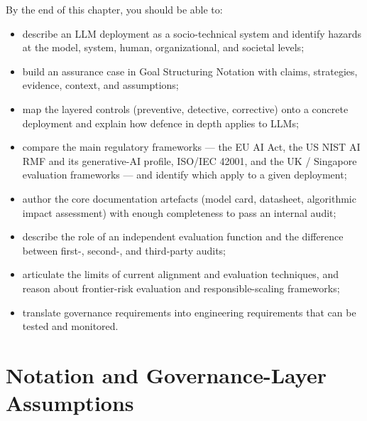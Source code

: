 By the end of this chapter, you should be able to:
\begin{itemize}
  \item describe an LLM deployment as a socio-technical system
        and identify hazards at the model, system, human,
        organizational, and societal levels;
  \item build an assurance case in Goal Structuring Notation
        with claims, strategies, evidence, context, and
        assumptions;
  \item map the layered controls (preventive, detective,
        corrective) onto a concrete deployment and explain how
        defence in depth applies to LLMs;
  \item compare the main regulatory frameworks --- the EU AI Act,
        the US NIST AI RMF and its generative-AI profile, ISO/IEC
        42001, and the UK / Singapore evaluation frameworks ---
        and identify which apply to a given deployment;
  \item author the core documentation artefacts (model card,
        datasheet, algorithmic impact assessment) with enough
        completeness to pass an internal audit;
  \item describe the role of an independent evaluation function
        and the difference between first-, second-, and
        third-party audits;
  \item articulate the limits of current alignment and evaluation
        techniques, and reason about frontier-risk evaluation
        and responsible-scaling frameworks;
  \item translate governance requirements into engineering
        requirements that can be tested and monitored.
\end{itemize}

\section{Notation and Governance-Layer Assumptions}
\label{sec:wk10_notation}

